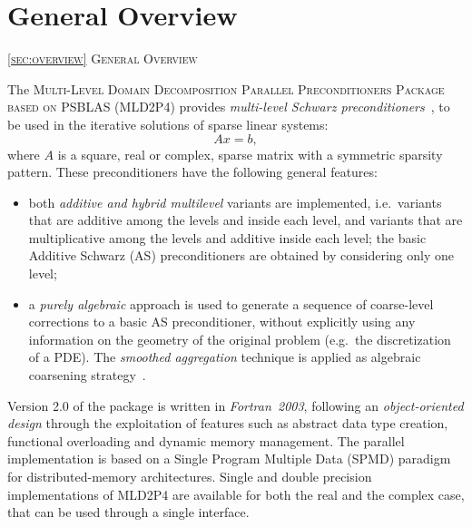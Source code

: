 \section{General Overview\label{sec:overview}}
         {\textsc{\ref{sec:overview} General Overview}}
            
The \textsc{Multi-Level Domain Decomposition Parallel Preconditioners Package based on
PSBLAS (MLD2P4}) provides \emph{multi-level Schwarz preconditioners}~\cite{dd2_96},
to be used in the iterative solutions of sparse linear systems:
\begin{equation} 
Ax=b, 
\label{system1}
\end{equation} 
where $A$ is a square, real or complex, sparse matrix with a symmetric
sparsity pattern. 
%
%
These preconditioners have the following general features:
\begin{itemize}
\item both \emph{additive and hybrid multilevel} variants are implemented,
i.e.\ variants that are additive among the levels and inside each level, and variants
that are multiplicative among the levels and additive inside each level;
the basic Additive Schwarz (AS) preconditioners are obtained by considering only one level;
\item a \emph{purely algebraic} approach is used to
generate a sequence of coarse-level corrections to a basic AS preconditioner, without
explicitly using any information on the geometry of the original problem (e.g.\ the
discretization of a PDE). The \emph{smoothed aggregation} technique is applied
as algebraic coarsening strategy~\cite{BREZINA_VANEK,VANEK_MANDEL_BREZINA}.
\end{itemize}

Version 2.0 of the package is written in \emph{Fortran~2003}, following an
\emph{object-oriented design} through the exploitation of features
such as abstract data type creation, functional overloading and
dynamic memory management. 
The parallel implementation is based on a Single Program Multiple Data
(SPMD) paradigm for distributed-memory architectures.  Single and
double precision implementations of MLD2P4 are available for both the
real and the complex case, that can be used through a single
interface. 


